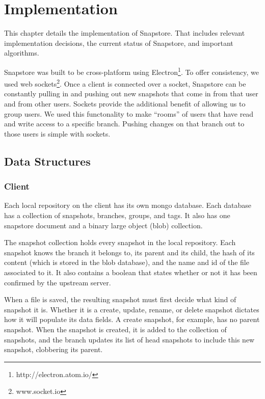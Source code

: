\chapter{Implementation}

This chapter details the implementation of Snapstore. That includes relevant implementation decisions, the current status of Snapstore, and important algorithms. 

Snapstore was built to be cross-platform using Electron\footnote{http://electron.atom.io/}. To offer consistency, we used web sockets\footnote{www.socket.io}. Once a client is connected over a socket, Snapstore can be constantly pulling in and pushing out new snapshots that come in from that user and from other users. Sockets provide the additional benefit of allowing us to group users. We used this functonality to make ``rooms'' of users that have read and write access to a specific branch. Pushing changes on that branch out to those users is simple with sockets.

\section{Data Structures}

\subsection{Client}

Each local repository on the client has its own mongo database. Each database has a collection of snapshots, branches, groups, and tags. It also has one snapstore document and a binary large object (blob) collection.

The snapshot collection holds every snapshot in the local repository. Each snapshot knows the branch it belongs to, its parent and its child, the hash of its content (which is stored in the blob database), and the name and id of the file associated to it. It also contains a boolean that states whether or not it has been confirmed by the upstream server.

When a file is saved, the resulting snapshot must first decide what kind of snapshot it is. Whether it is a create, update, rename, or delete snapshot dictates how it will populate its data fields. A create snapshot, for example, has no parent snapshot. When the snapshot is created, it is added to the collection of snapshots, and the branch updates its list of head snapshots to include this new snapshot, clobbering its parent.

